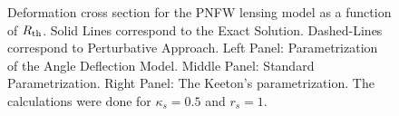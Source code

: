\begin{figure}[!ht]
{}
\caption{\label{dcs_pnfw_rth_pm} Deformation cross section for the  PNFW lensing
model as a function of $R_{\rm th}$. Solid Lines correspond to the Exact
Solution. Dashed-Lines correspond to Perturbative Approach. Left Panel:
Parametrization of the Angle Deflection Model. Middle Panel: Standard
Parametrization. Right Panel: The Keeton's parametrization. The calculations
were done for $\kappa_s=0.5$ and $r_s=1$.}
\end{figure}
